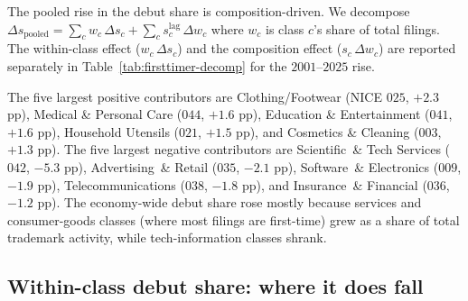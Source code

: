 \documentclass[11pt]{article}
\begin{document}
The pooled rise in the debut share is composition-driven. We
decompose $\Delta s_\text{pooled} = \sum_c w_c\,\Delta s_c + \sum_c
s_c^{\text{lag}}\,\Delta w_c$ where $w_c$ is class $c$'s share of
total filings. The within-class effect ($w_c\,\Delta s_c$) and the
composition effect ($s_c\,\Delta w_c$) are reported separately in
Table~\ref{tab:firsttimer-decomp} for the $2001$--$2025$ rise.

\begin{table}[h]
\centering
\small

\caption{Top-5 and bottom-5 NICE-class contributions to the
$2001$--$2025$ pooled debut-share rise, decomposed into within-class
(change in class-specific debut share at fixed weight) and
composition (change in class's share of total filings at fixed
within-class debut share). The pooled $+10$ percentage-point rise is
roughly $35\%$ within-class and $65\%$ composition: classes with
high within-class debut shares (consumer goods, services) grew as a
share of total filings, while classes with lower within-class debut
shares (Sci~\&~Tech $042$, Software $009$, Advertising $035$) shrank.}
\label{tab:firsttimer-decomp}
\end{table}

The five largest positive contributors are
Clothing/Footwear (NICE $025$, $+2.3$ pp),
Medical \& Personal Care ($044$, $+1.6$ pp),
Education \& Entertainment ($041$, $+1.6$ pp),
Household Utensils ($021$, $+1.5$ pp), and
Cosmetics \& Cleaning ($003$, $+1.3$ pp).
The five largest negative contributors are
Scientific~\& Tech Services ($042$, $-5.3$ pp),
Advertising~\& Retail ($035$, $-2.1$ pp),
Software~\& Electronics ($009$, $-1.9$ pp),
Telecommunications ($038$, $-1.8$ pp), and
Insurance~\& Financial ($036$, $-1.2$ pp). The economy-wide debut
share rose mostly because services and consumer-goods classes
(where most filings are first-time) grew as a share of total
trademark activity, while tech-information classes shrank.

\subsection*{Within-class debut share: where it does fall}
\end{document}
